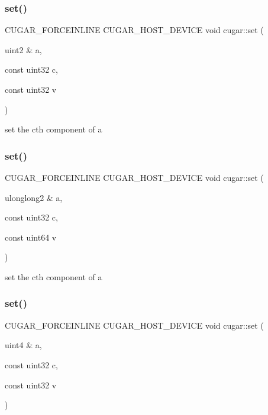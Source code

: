 \subsubsection{\texorpdfstring{set()}{set()}\hspace{0.1cm}{\footnotesize\ttfamily [1/4]}}
{\footnotesize\ttfamily C\+U\+G\+A\+R\+\_\+\+F\+O\+R\+C\+E\+I\+N\+L\+I\+NE C\+U\+G\+A\+R\+\_\+\+H\+O\+S\+T\+\_\+\+D\+E\+V\+I\+CE void cugar\+::set (\begin{DoxyParamCaption}\item[{uint2 \&}]{a,  }\item[{const uint32}]{c,  }\item[{const uint32}]{v }\end{DoxyParamCaption})}

set the c\textquotesingle{}th component of a \mbox{\label{group___basic_gabe33a8750c36216a280b69f972f662c5}} 
\subsubsection{\texorpdfstring{set()}{set()}\hspace{0.1cm}{\footnotesize\ttfamily [2/4]}}
{\footnotesize\ttfamily C\+U\+G\+A\+R\+\_\+\+F\+O\+R\+C\+E\+I\+N\+L\+I\+NE C\+U\+G\+A\+R\+\_\+\+H\+O\+S\+T\+\_\+\+D\+E\+V\+I\+CE void cugar\+::set (\begin{DoxyParamCaption}\item[{ulonglong2 \&}]{a,  }\item[{const uint32}]{c,  }\item[{const uint64}]{v }\end{DoxyParamCaption})}

set the c\textquotesingle{}th component of a \mbox{\label{group___basic_ga02d9003c4a4c31d671a38739bdbd223b}} 
\subsubsection{\texorpdfstring{set()}{set()}\hspace{0.1cm}{\footnotesize\ttfamily [3/4]}}
{\footnotesize\ttfamily C\+U\+G\+A\+R\+\_\+\+F\+O\+R\+C\+E\+I\+N\+L\+I\+NE C\+U\+G\+A\+R\+\_\+\+H\+O\+S\+T\+\_\+\+D\+E\+V\+I\+CE void cugar\+::set (\begin{DoxyParamCaption}\item[{uint4 \&}]{a,  }\item[{const uint32}]{c,  }\item[{const uint32}]{v }\end{DoxyParamCaption})}

